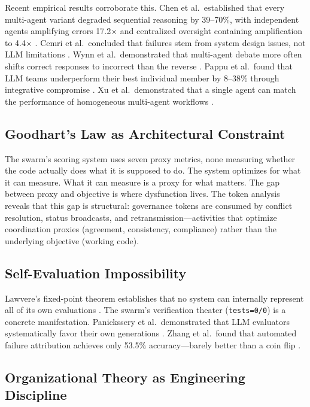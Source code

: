 \documentclass[11pt,a4paper]{article}
\begin{document}
Recent empirical results corroborate this. Chen et al.\ established that every multi-agent variant degraded sequential reasoning by 39--70\%, with independent agents amplifying errors 17.2$\times$ and centralized oversight containing amplification to 4.4$\times$ \citep{chen2025scaling}. Cemri et al.\ concluded that failures stem from system design issues, not LLM limitations \citep{cemri2025}. Wynn et al.\ demonstrated that multi-agent debate more often shifts correct responses to incorrect than the reverse \citep{wynn2025}. Pappu et al.\ found that LLM teams underperform their best individual member by 8--38\% through integrative compromise \citep{pappu2026}. Xu et al.\ demonstrated that a single agent can match the performance of homogeneous multi-agent workflows \citep{xu2026}.

\subsection{Goodhart's Law as Architectural Constraint}

The swarm's scoring system uses seven proxy metrics, none measuring whether the code actually does what it is supposed to do. The system optimizes for what it can measure. What it can measure is a proxy for what matters. The gap between proxy and objective is where dysfunction lives. The token analysis reveals that this gap is structural: governance tokens are consumed by conflict resolution, status broadcasts, and retransmission---activities that optimize coordination proxies (agreement, consistency, compliance) rather than the underlying objective (working code).

\subsection{Self-Evaluation Impossibility}

Lawvere's fixed-point theorem establishes that no system can internally represent all of its own evaluations \citep{lawvere1969, yanofsky2003}. The swarm's verification theater (\texttt{tests=0/0}) is a concrete manifestation. Panickssery et al.\ demonstrated that LLM evaluators systematically favor their own generations \citep{panickssery2024}. Zhang et al.\ found that automated failure attribution achieves only 53.5\% accuracy---barely better than a coin flip \citep{zhang2025}.

\subsection{Organizational Theory as Engineering Discipline}
\end{document}
